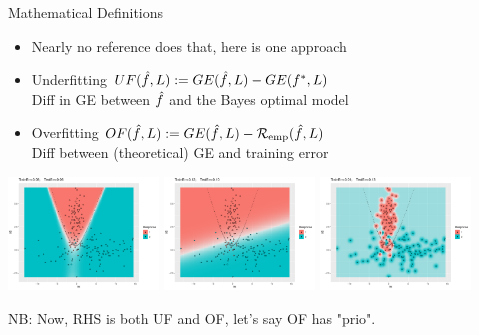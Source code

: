 \begin{vbframe}{Mathematical Definitions}

\begin{itemize}
\item Nearly no reference does that, here is one approach
\item Underfitting
    $UF(\hat{f}, L) : = GE(\hat{f}, L) - GE(f^{*}, L)$\\
    Diff in GE between $\hat{f}$ and the Bayes optimal model
\item Overfitting
    $OF(\hat{f}, L) : = GE(\hat{f}, L) - \mathcal{R}_{\text{emp}}(\hat{f}, L)$\\
    Diff between (theoretical) GE and training error
\end{itemize}

\lz

\begin{center}
\includegraphics[width=0.3\textwidth,trim={0.8cm 0.6cm 3cm 0},clip]{figure/eval_ofit_1a}
\includegraphics[width=0.3\textwidth,trim={0.8cm 0.6cm 3cm 0},clip]{figure/eval_ofit_1u}
\includegraphics[width=0.3\textwidth,trim={0.8cm 0.6cm 3cm 0},clip]{figure/eval_ofit_1o}
\end{center}
NB: Now, RHS is both UF and OF, let's say OF has "prio". 
\end{vbframe}


